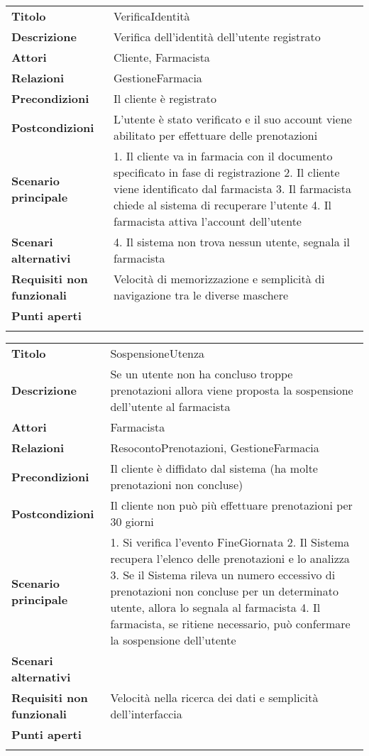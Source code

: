 \begin{longtable}[c]{@{}ll@{}}
\toprule\addlinespace
\textbf{Titolo} & VerificaIdentità
\\\addlinespace
\textbf{Descrizione} & Verifica dell'identità dell'utente registrato
\\\addlinespace
\textbf{Attori} & Cliente, Farmacista
\\\addlinespace
\textbf{Relazioni} & GestioneFarmacia
\\\addlinespace
\textbf{Precondizioni} & Il cliente è registrato
\\\addlinespace
\textbf{Postcondizioni} & L'utente è stato verificato e il suo account
viene abilitato per effettuare delle prenotazioni
\\\addlinespace
\textbf{Scenario principale} & 1. Il cliente va in farmacia con il
documento specificato in fase di registrazione 2. Il cliente viene
identificato dal farmacista 3. Il farmacista chiede al sistema di
recuperare l'utente 4. Il farmacista attiva l'account dell'utente
\\\addlinespace
\textbf{Scenari alternativi} & 4. Il sistema non trova nessun utente,
segnala il farmacista
\\\addlinespace
\textbf{Requisiti non funzionali} & Velocità di memorizzazione e
semplicità di navigazione tra le diverse maschere
\\\addlinespace
\textbf{Punti aperti} &
\\\addlinespace
\bottomrule
\end{longtable}

\begin{longtable}[c]{@{}ll@{}}
\toprule\addlinespace
\textbf{Titolo} & SospensioneUtenza
\\\addlinespace
\textbf{Descrizione} & Se un utente non ha concluso troppe prenotazioni
allora viene proposta la sospensione dell'utente al farmacista
\\\addlinespace
\textbf{Attori} & Farmacista
\\\addlinespace
\textbf{Relazioni} & ResocontoPrenotazioni, GestioneFarmacia
\\\addlinespace
\textbf{Precondizioni} & Il cliente è diffidato dal sistema (ha molte
prenotazioni non concluse)
\\\addlinespace
\textbf{Postcondizioni} & Il cliente non può più effettuare prenotazioni
per 30 giorni
\\\addlinespace
\textbf{Scenario principale} & 1. Si verifica l'evento FineGiornata 2.
Il Sistema recupera l'elenco delle prenotazioni e lo analizza 3. Se il
Sistema rileva un numero eccessivo di prenotazioni non concluse per un
determinato utente, allora lo segnala al farmacista 4. Il farmacista, se
ritiene necessario, può confermare la sospensione dell'utente
\\\addlinespace
\textbf{Scenari alternativi} &
\\\addlinespace
\textbf{Requisiti non funzionali} & Velocità nella ricerca dei dati e
semplicità dell'interfaccia
\\\addlinespace
\textbf{Punti aperti} &
\\\addlinespace
\bottomrule
\end{longtable}

